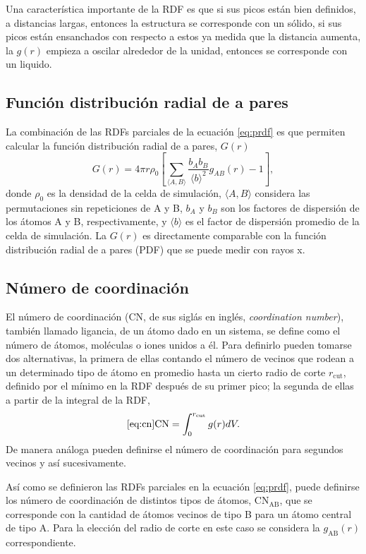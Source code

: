 Una característica importante de la RDF es que si sus picos están bien definidos,
a distancias largas, entonces la estructura se corresponde con un sólido, si sus 
picos están ensanchados con respecto a estos ya medida que la distancia aumenta, 
la $g(r)$ empieza a oscilar alrededor de la unidad, entonces se corresponde con 
un liquido.


\subsection{Función distribución radial de a pares}

La combinación de las RDFs parciales de la ecuación \ref{eq:prdf} es que permiten
calcular la función distribución radial de a pares, $G(r)$ \cite{billinge2019}
\begin{equation}
    G(r) = 4 \pi r \rho_0 \left[\sum_{\langle A,B \rangle} \frac{b_A b_B}{\langle b\rangle^2} g_{AB}(r) - 1\right], 
\end{equation}
donde $\rho_0$ es la densidad de la celda de simulación, $\langle A, B \rangle$
considera las permutaciones sin repeticiones de A y B, $b_A$ y $b_B$ son los 
factores de dispersión de los átomos A y B, respectivamente, y $\langle b \rangle$
es el factor de dispersión promedio de la celda de simulación. La $G(r)$ es 
directamente comparable con la función distribución radial de a pares (PDF) que 
se puede medir con rayos x.


\subsection{Número de coordinación}\label{ss:cn}

El número de coordinación (CN, de sus siglás en inglés, \textit{coordination 
number}), también llamado ligancia, de un átomo dado en un sistema, se define 
como el número de átomos, moléculas o iones unidos a él. Para definirlo pueden 
tomarse dos alternativas, la primera de ellas contando el número de vecinos que 
rodean a un determinado tipo de átomo en promedio hasta un cierto radio de corte 
$r_{\text{cut}}$, definido por el mínimo en la RDF después de su primer pico; 
la segunda de ellas a partir de la integral de la RDF,
\begin{equation}\ref{eq:cn}
    \text{CN} = \int_0^{r_{\text{cut}}} g(r) dV.
\end{equation}
De manera análoga pueden definirse el número de coordinación para segundos 
vecinos y así sucesivamente.

Así como se definieron las RDFs parciales en la ecuación \ref{eq:prdf}, puede 
definirse los número de coordinación de distintos tipos de átomos,
CN$_{\text{AB}}$, que se corresponde con la cantidad de átomos vecinos de tipo
B para un átomo central de tipo A. Para la elección del radio de corte en 
este caso se considera la $g_{\text{AB}}(r)$ correspondiente.

